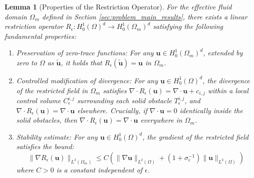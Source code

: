 \documentclass{elsarticle}
\newtheorem{lemma}{Lemma}
\begin{document}
\begin{lemma}[Properties of the Restriction Operator]\label{lemma:restriction_operator}
    For the effective fluid domain $\Omega_m$ defined in Section \ref{sec:problem_main_results}, there exists a linear restriction operator $R_{\epsilon}: H_0^1(\Omega)^d \to H_0^1(\Omega_m)^d$ satisfying the following fundamental properties:
    \begin{enumerate}
        \item {Preservation of zero-trace functions}: For any $\mathbf{u} \in H_0^1(\Omega_m)^d$, extended by zero to $\Omega$ as $\tilde{\mathbf{u}}$, it holds that $R_{\epsilon}(\tilde{\mathbf{u}}) = \mathbf{u}$ in $\Omega_m$.
        \item {Controlled modification of divergence}: For any $\mathbf{u} \in H_0^1(\Omega)^d$, the divergence of the restricted field in $\Omega_m$ satisfies $\nabla \cdot R_{\epsilon}(\mathbf{u}) = \nabla \cdot \mathbf{u} + c_{i,j}$ within a local control volume $C_{\epsilon}^{i,j}$ surrounding each solid obstacle $T_{\epsilon}^{i,j}$, and $\nabla \cdot R_{\epsilon}(\mathbf{u}) = \nabla \cdot \mathbf{u}$ elsewhere. Crucially, {if $\nabla \cdot \mathbf{u} = 0$ identically inside the solid obstacles, then $\nabla \cdot R_{\epsilon}(\mathbf{u}) = \nabla \cdot \mathbf{u}$ everywhere in $\Omega_m$}.
        \item {Stability estimate}: For any $\mathbf{u} \in H_0^1(\Omega)^d$, the gradient of the restricted field satisfies the bound:
              \begin{equation}
                  \|\nabla R_{\epsilon}(\mathbf{u})\|_{L^2(\Omega_m)} \le C \left( \|\nabla \mathbf{u}\|_{L^2(\Omega)} + (1 + \sigma_{\epsilon}^{-1}) \|\mathbf{u}\|_{L^2(\Omega)} \right)
              \end{equation}
              where $C > 0$ is a constant independent of $\epsilon$.
    \end{enumerate}
\end{lemma}
\end{document}
